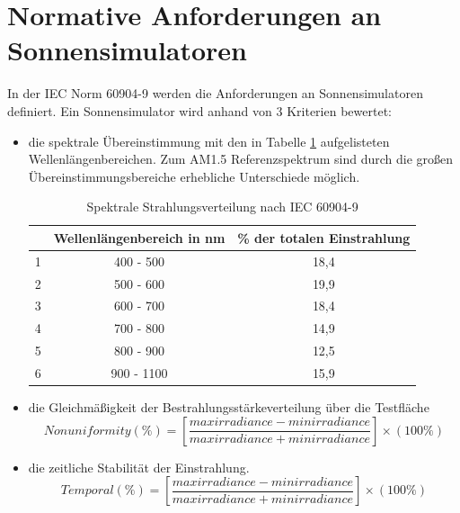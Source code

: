 \documentclass[a4paper,bibtotoc,oneside]{scrbook}
\begin{document}
\section{Normative Anforderungen an Sonnensimulatoren}\thispagestyle{empty}
In der IEC Norm 60904-9 \cite{norm9} werden die Anforderungen an Sonnensimulatoren definiert. Ein Sonnensimulator wird anhand von 3 Kriterien bewertet: 
\begin{itemize}
\item die spektrale Übereinstimmung mit den in Tabelle \ref{TabS1} aufgelisteten Wellenlängenbereichen. Zum AM1.5 Referenzspektrum sind durch die großen Übereinstimmungsbereiche erhebliche Unterschiede möglich.
\begin{table}[htbp]
\centering
\begin{tabular}{ | c | c | c |}\hline
{\bf } & {\bf Wellenlängenbereich in nm} & {\bf \% der totalen Einstrahlung}\\ \hline
\hline
1  & 400 - 500 & 18,4 \\ \hline
2  & 500 - 600 & 19,9\\ \hline
3  & 600 - 700 & 18,4\\ \hline
4  & 700 - 800 & 14,9\\ \hline
5  & 800 - 900 & 12,5\\ \hline
6  & 900 - 1100 & 15,9\\ \hline
\end{tabular}
\caption{Spektrale Strahlungsverteilung nach IEC 60904-9}\label{TabS1}
\end{table}
\item die Gleichmäßigkeit der Bestrahlungsstärkeverteilung über die Testfläche
	\begin{equation}
 Nonuniformity (\%) = [\frac{max irradiance - min irradiance}{max irradiance + min irradiance}] \times (100\%)
\end{equation}
\item die zeitliche Stabilität der Einstrahlung.
\begin{equation}
 Temporal (\%) = [\frac{max irradiance - min irradiance}{max irradiance + min irradiance}] \times (100\%)
\end{equation}
\end{itemize}
\end{document}

